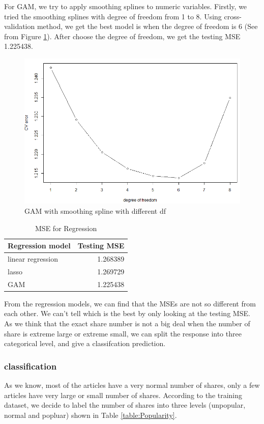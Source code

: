 \documentclass[11pt]{article}
\begin{document}
For GAM, we try to apply smoothing splines to numeric variables. Firstly, we tried the smoothing splines with degree of freedom from 1 to 8. Using cross-validation method, we get the best model is when the degree of freedom is 6 (See from Figure \ref{fig:gam}). After choose the degree of freedom, we get the testing MSE 1.225438. \\ 

    \begin{figure}[h]
        \centering
        \includegraphics[width=0.7\linewidth]{gam_plot.png}
        \caption{GAM with smoothing spline with different df}
        \label{fig:gam}
    \end{figure}

    \begin{table}[h]
        \centering
        \caption{MSE for Regression}
        \begin{tabular}{ l | r }
            \hline\hline
            Regression model & Testing MSE\\
            \hline
            linear regression & 1.268389 \\
            lasso & 1.269729 \\
            GAM & 1.225438 \\
            \hline\hline
        \end{tabular}
        \label{table:1}
    \end{table}

From the regression models, we can find that the MSEs are not so different from each other. We can't tell which is the best by only looking at the testing MSE. As we think that the exact share number is not a big deal when the number of share is extreme large or extreme small, we can split the response into three categorical level, and give a classifcation prediction.

\subsubsection{classification}
As we know, most of the articles have a very normal number of shares, only a few articles have very large or small number of shares. According to the training dataset, we decide to label the number of shares into three levels (unpopular, normal and popluar) shown in Table \ref{table:Popularity}. \\
\end{document}
